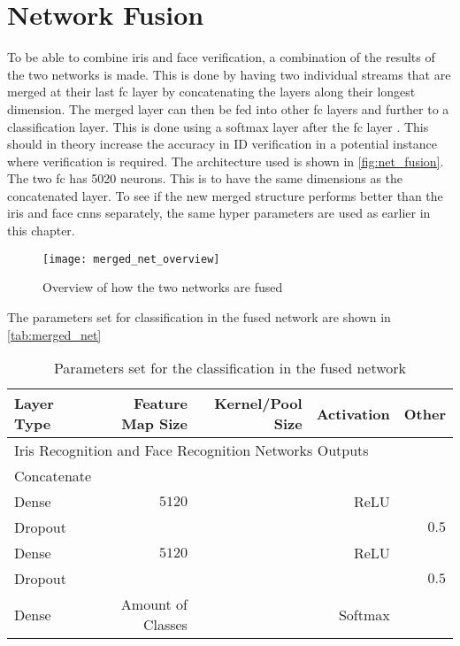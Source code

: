 \section{Network Fusion}
To be able to combine iris and face verification, a combination of the results of the two networks is made.  This is done by having two individual streams that are merged at their last \gls{fc} layer by concatenating the layers along their longest dimension. The merged layer can then be fed into other \gls{fc} layers and further to a classification layer. This is done using a softmax layer after the \gls{fc} layer \citep{Eitel2015}. This should in theory increase the accuracy in ID verification in a potential instance where verification is required. The architecture used is shown in \autoref{fig:net_fusion}. The two \gls{fc} has 5020 neurons. This is to have the same dimensions as the concatenated layer. To see if the new merged structure performs better than the iris and face \gls{cnn}s separately, the same hyper parameters are used as earlier in this chapter.

\begin{figure}[h]
	\centering
	\texttt{[image: merged\_net\_overview]}
	\caption{Overview of how the two networks are fused}
	\label{fig:net_fusion}
\end{figure}

The parameters set for classification in the fused network are shown in \autoref{tab:merged_net}

\begin{table}[h]
	\centering
	\caption{Parameters set for the classification in the fused network}
	\label{tab:merged_net}
	\begin{tabular}{lrrrr}
		\textbf{Layer Type} & \textbf{Feature Map Size} & \textbf{Kernel/Pool Size} & \textbf{Activation} & \textbf{Other} \\ \hline
		\multicolumn{5}{l}{Iris Recognition and Face Recognition Networks Outputs}                                        \\
		\rowcolor{lightGrey}
		Concatenate         &                           &                           &                     &                \\
		Dense               & $5120$                    &                           & ReLU                &                \\
		\rowcolor{lightGrey} 
		Dropout             &                           &                           &                     & $0.5$          \\
		Dense               & $5120$                    &                           & ReLU                &                \\
		\rowcolor{lightGrey} 
		Dropout             &                           &                           &                     & $0.5$          \\
		Dense               & Amount of Classes         &                           &  Softmax            &               
	\end{tabular}
\end{table}

